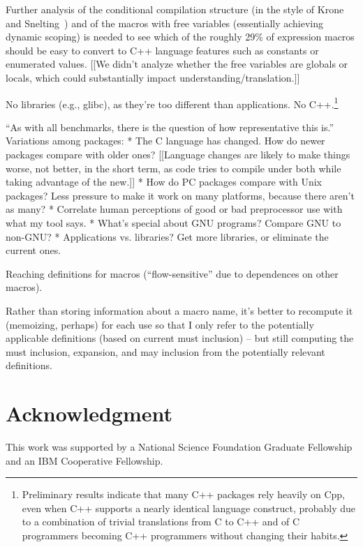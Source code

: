 \documentclass[10pt]{article}
\newcommand{\pkg}[1]{\textsf{#1}}
\begin{document}
Further analysis of the conditional
compilation structure (in the style of Krone and Snelting~\cite{Krone94})
and of the macros with free variables (essentially achieving dynamic
scoping) is needed to see which of the roughly 29\% of expression macros
should be easy to convert to C++ language features such as constants or
enumerated values.
  [[We didn't analyze whether the free variables are globals or locals,
          which could substantially impact understanding/translation.]]


No libraries (e.g., \pkg{glibc}), as they're too different than applications.
No C++.\footnote{Preliminary results indicate that many
  C++ packages rely heavily on Cpp, even when C++ supports a nearly
  identical language construct, probably due to a combination of trivial
  translations from C to C++ and of C programmers becoming C++ programmers
  without changing their habits.}

``As with all benchmarks, there is the question of how representative this is.''
Variations among packages:
 * The C language has changed.  How do newer packages compare with older ones?
   [[Language changes are likely to make things worse, not better, in the
   short term, as code tries to compile under both while taking advantage
   of the new.]]
 * How do PC packages compare with Unix packages?  Less pressure to make it
   work on many platforms, because there aren't as many?
 * Correlate human perceptions of good or bad preprocessor use with what my
   tool says.
 * What's special about GNU programs?  Compare GNU to non-GNU?
 * Applications vs. libraries?  Get more libraries, or eliminate the current
   ones.




          
Reaching definitions for macros (``flow-sensitive'' due to
dependences on other macros).

Rather than storing information about a macro name, it's better to
recompute it (memoizing, perhaps) for each use so that I only refer to the
potentially applicable definitions (based on current must inclusion) -- but
still computing the must inclusion, expansion, and may inclusion from the
potentially relevant definitions.  


\section*{Acknowledgment}

This work was supported by a National Science Foundation Graduate
Fellowship and an IBM Cooperative Fellowship.
    
\end{document}

